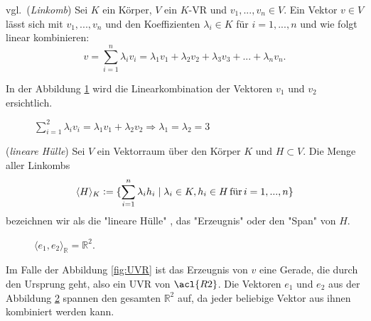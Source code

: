 \begin{definition}vgl.\,\cite[S. 298, 16.3]{Tut} (\emph{\acl{Linkomb}}) Sei $K$ ein Körper, $V$ ein $K$-\acl{VR} und ${v_1,...,v_n \in V}$. Ein Vektor $v \in V$ lässt sich mit $v_1,...,v_n$ und den Koeffizienten $\lambda_i \in K$ für $i=1,...,n$ und wie folgt linear kombinieren:
\[v = \sum_{i=1}^n \lambda_i v_i = \lambda_1 v_1 + \lambda_2 v_2 + \lambda_3 v_3 + ... + \lambda_n v_n \text{.}\]
\end{definition}

\begin{example}
In der Abbildung \ref{linkombgrafik} wird die Linearkombination der Vektoren $v_1$ und $v_2$ ersichtlich.
 
\end{example}
\begin{figure}[h]
\centering
\def\svgwidth{150pt}

\caption{\(\sum \limits_{i=1}^{2} \lambda_i v_i = \lambda_1 v_1 + \lambda_2 v_2\Rightarrow\lambda_1=\lambda_2=3\)}
\label{linkombgrafik}
\end{figure}

\newpage
\begin{definition}\cite[S. 30, 1.5]{Bosch} (\emph{lineare Hülle}) Sei $V$ ein Vektorraum über den Körper $K$ und $H \subset V$. Die Menge aller \aclp{Linkomb} 
\[\langle H \rangle_K \vcentcolon= \{ \sum \limits_{i=1}^{n} \lambda_i h_i \mid \lambda_i \in K, h_i \in H \, \text{für} \, i = 1,...,n \} \]
bezeichnen wir als die "lineare Hülle" \cite[S. 298, 16.4]{Tut}, das "Erzeugnis" \cite[S. 298, 16.4]{Tut} oder den "Span" \cite[S. 298, 16.4]{Tut} von $H$. 
\label{linhuelledef}
\end{definition}

\begin{figure} [htbp]
 	\centering
	\begin{minipage}[b]{0.4\textwidth}
		\def\svgwidth{175pt}
		
		\caption{$\langle v \rangle_\mathbb{R} \in \mathbb{R}^2$} 
		\label{fig:UVR}
	\end{minipage}
\hfill
	\begin{minipage}[b]{0.4\textwidth}
		\def\svgwidth{175pt}
		
		\caption{\( \langle e_1,e_2 \rangle_{\mathbb{R}} = \mathbb{R}^2\).}
		\label{fig:EZS}
	\end{minipage}
\end{figure} 
Im Falle der Abbildung \ref{fig:UVR} ist das Erzeugnis von $v$ eine Gerade, die durch den Ursprung geht, also ein \acl{UVR} von $\acl{R2}$. Die Vektoren $e_1$ und $e_2$ aus der Abbildung \ref{fig:EZS} spannen den gesamten $\mathbb{R}^2$ auf, da jeder beliebige Vektor aus ihnen kombiniert werden kann.
 
